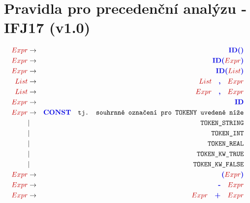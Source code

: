 \documentclass[a4paper,11pt,fleqn,leqno]{article}
\begin{document}
\section{Pravidla pro precedenční analýzu - IFJ17 (v1.0)}

\begin{eqnarray}
\setcounter{equation}{0}
\textcolor{red1}{Expr}   &   \rightarrow     & \textcolor{blue1}{\textbf{ID}\textbf{(}\textbf{)}}              \\
\textcolor{red1}{Expr}   &   \rightarrow     & \textcolor{blue1}{\textbf{ID}\textbf{(}}\textcolor{red1}{Expr}\textcolor{blue1}{\textbf{)}}             \\
\textcolor{red1}{Expr}   &   \rightarrow     & \textcolor{blue1}{\textbf{ID}\textbf{(}}\textcolor{red1}{List}\textcolor{blue1}{\textbf{)}}             \\
\textcolor{red1}{List}   &   \rightarrow     & \textcolor{red1}{List}\quad\textcolor{blue1}{\textbf{,}}\quad\textcolor{red1}{Expr}               \\
\textcolor{red1}{List}   &   \rightarrow     & \textcolor{red1}{Expr}\quad\textcolor{blue1}{\textbf{,}}\quad\textcolor{red1}{Expr}               \\
\textcolor{red1}{Expr}   &   \rightarrow     & \textcolor{blue1}{\textbf{ID}}                \\
\textcolor{red1}{Expr}   &   \rightarrow     & \textcolor{blue1}{\textbf{CONST}}\quad \textrm{\texttt{tj. souhrnné označení pro TOKENY uvedené níže}}\nonumber \\
& | & \textrm{\texttt{TOKEN\_STRING}} \\
& | & \textrm{\texttt{TOKEN\_INT}}    \\
& | & \textrm{\texttt{TOKEN\_REAL}}   \\
& | & \textrm{\texttt{TOKEN\_KW\_TRUE}}   \\
& | & \textrm{\texttt{TOKEN\_KW\_FALSE}} \\
\textcolor{red1}{Expr}   &   \rightarrow     & \textcolor{blue1}{\textbf{(}}\textcolor{red1}{Expr}\textcolor{blue1}{\textbf{)}}               \\
\textcolor{red1}{Expr}   &   \rightarrow     & \textcolor{blue1}{\textbf{-}}\quad \textcolor{red1}{Expr}   \\
\textcolor{red1}{Expr}   &   \rightarrow     & \textcolor{red1}{Expr}\quad\textcolor{blue1}{\textbf{+}}\quad \textcolor{red1}{Expr}   \\

\end{eqnarray}
\end{document}
